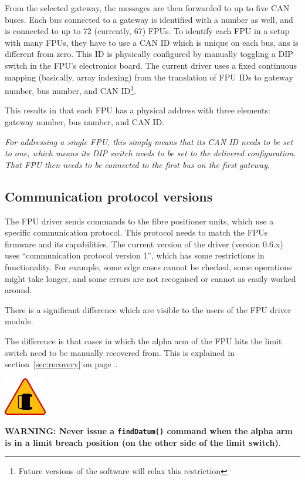 \documentclass[11pt,a4paper]{scrartcl}
\newenvironment{warning}{\begin{framed}\includegraphics[width=5em]{accident-area-ahead.png}
}{\end{framed}}
\begin{document}
From the selected gateway, the messages are then forwarded to up to
five CAN buses. Each bus connected to a gateway is identified with a
number as well, and is connected to up to 72 (currently, 67) FPUs.
 To identify each FPU in a setup with many FPUs,
they have to use a CAN ID which is unique on each bus, ans is
different from zero. This ID is physically configured by manually
toggling a DIP switch in the FPU's electronics board. The current
driver uses a fixed continuous mapping (basically, array indexing)
from the translation of FPU IDs to gateway number, bus number, and CAN
ID\footnote{Future versions of the software will relax this
  restriction}.

This results in that each FPU has a physical address with three
elements: gateway number, bus number, and CAN ID.

\emph{For addressing a single FPU, this simply means that its CAN ID
  needs to be set to one, which means its DIP switch needs to be set
  to the delivered configuration. That FPU then needs to be connected
  to the first bus on the first gateway}.


\subsection{Communication protocol versions}
The FPU driver sends commands to the fibre positioner units, which use
a specific communication protocol. This protocol needs to match the
FPUs firmware and its capabilities. The current version of the driver
(version 0.6.x) uses ``communication protocol version 1'', which has
some restrictions in functionality. For example, some edge cases
cannot be checked, some operations might take longer, and some errors
are not recognised or cannot as easily worked around.

There is a  significant difference which are visible to the users
of the FPU driver module. 

The difference is that cases in which the alpha arm of the FPU hits
the limit switch need to be manually recovered from. This is explained
in section~\ref{sec:recovery} on page~\pageref{sec:recovery}.



\begin{warning}
\textbf{WARNING: Never issue a \texttt{findDatum()} command when the
  alpha arm is in a limit breach position (on the other side of the
  limit switch)}.
\end{warning}
\end{document}
